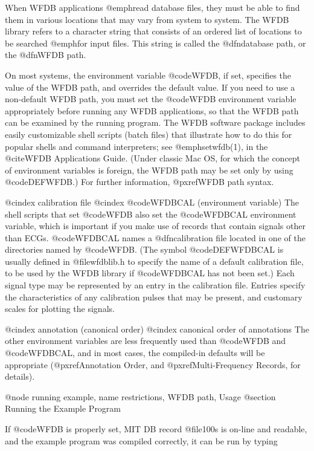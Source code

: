 {When WFDB applications @emph{read} database files, they must be able to
find them in various locations that may vary from system to system.  The
WFDB library refers to a character string that consists of an ordered
list of locations to be searched @emph{for input files}.  This string is
called the @dfn{database path}, or the @dfn{WFDB path}.

On most systems, the environment variable @code{WFDB}, if set, specifies
the value of the WFDB path, and overrides the default value.  If you
need to use a non-default WFDB path, you must set the @code{WFDB}
environment variable appropriately before running any WFDB applications,
so that the WFDB path can be examined by the running program.  The WFDB
software package includes easily customizable shell scripts (batch
files) that illustrate how to do this for popular shells and command
interpreters; see @emph{setwfdb}(1), in the @cite{WFDB Applications
Guide}.  (Under classic Mac OS, for which the concept of environment
variables is foreign, the WFDB path may be set only by using
@code{DEFWFDB}.)  For further information, @pxref{WFDB path syntax}.

@cindex calibration file
@cindex @code{WFDBCAL} (environment variable)
The shell scripts that set @code{WFDB} also set the @code{WFDBCAL}
environment variable, which is important if you make use of records that
contain signals other than ECGs.  @code{WFDBCAL} names a
@dfn{calibration file} located in one of the directories named by
@code{WFDB}.  (The symbol @code{DEFWFDBCAL} is usually defined in
@file{wfdblib.h} to specify the name of a default calibration file, to
be used by the WFDB library if @code{WFDBCAL} has not been set.)  Each
signal type may be represented by an entry in the calibration file.
Entries specify the characteristics of any calibration pulses that may
be present, and customary scales for plotting the signals.

@cindex annotation (canonical order)
@cindex canonical order of annotations
The other environment variables are less frequently used than @code{WFDB}
and @code{WFDBCAL}, and in most cases, the compiled-in defaults will be
appropriate (@pxref{Annotation Order}, and @pxref{Multi-Frequency Records},
for details).

@node     running example, name restrictions, WFDB path, Usage
@section Running the Example Program

If @code{WFDB} is properly set, MIT DB record @file{100s} is on-line and
readable, and the example program was compiled correctly, it can be run
by typing

}
